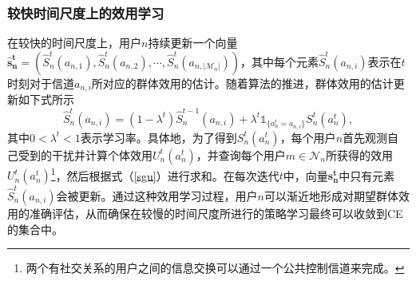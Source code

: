 \subsubsection{较快时间尺度上的效用学习}
在较快的时间尺度上，用户$n$持续更新一个向量$\mathbf{\hat{s}^t_n}=\left(\hat{S}^t_n(a_{n,1}),\hat{S}^t_n(a_{n,2}),\cdots,\hat{S}^t_n(a_{n,|\mathcal{M}_n|})\right)$，其中每个元素$\hat{S}^t_n(a_{n,i})$表示在$t$时刻对于信道$a_{n,i}$所对应的群体效用的估计。随着算法的推进，群体效用的估计更新如下式所示
\begin{equation}\label{estimation}
\hat{S}^t_n(a_{n,i})=(1-\lambda^t)\hat{S}^{t-1}_n(a_{n,i})+\lambda^t\mathds{1}_{\{a^t_n=a_{n,i}\}}S^t_n(a_n^t),
\end{equation}
其中$0<\lambda^t<1$表示学习率。具体地，为了得到$S^t_n(a^t_n)$，每个用户$n$首先观测自己受到的干扰并计算个体效用$U^t_n(a^t_n)$，并查询每个用户$m\in\mathcal{N}_n$所获得的效用$U^t_n(a^t_n)$\footnote{两个有社交关系的用户之间的信息交换可以通过一个公共控制信道来完成。}，然后根据式（\ref{sgu}）进行求和。在每次迭代$t$中，向量$\mathbf{s^t_n}$中只有元素$\hat{S}^t_n(a_{n,i})$会被更新。通过这种效用学习过程，用户$n$可以渐近地形成对期望群体效用的准确评估，从而确保在较慢的时间尺度所进行的策略学习最终可以收敛到CE的集合中。
